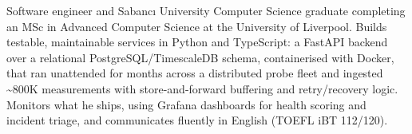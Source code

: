 
\newcommand{\cvprojects}{onepage_projects_backend}



Software engineer and Sabancı University Computer Science graduate completing an MSc in Advanced Computer Science at the University of Liverpool. Builds testable, maintainable services in Python and TypeScript: a FastAPI backend over a relational PostgreSQL/TimescaleDB schema, containerised with Docker, that ran unattended for months across a distributed probe fleet and ingested \textasciitilde 800K measurements with store-and-forward buffering and retry/recovery logic. Monitors what he ships, using Grafana dashboards for health scoring and incident triage, and communicates fluently in English (TOEFL iBT 112/120).




